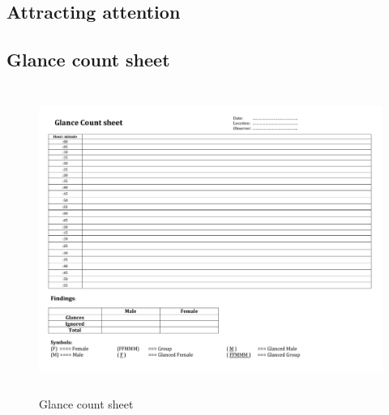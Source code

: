 
\begin{appendices}

\makeatletter
{}
\makeatother


\chapter{Attracting attention}

\section{Glance count sheet}

\begin{figure}[H]
 \centering 
    \includegraphics[width=\textwidth,height=100mm]{Appendices/3/Glance_Count_Method.pdf}
    \caption{Glance count sheet}
     \label{app:Glance_Count_Method}%
\end{figure}



\end{appendices}
